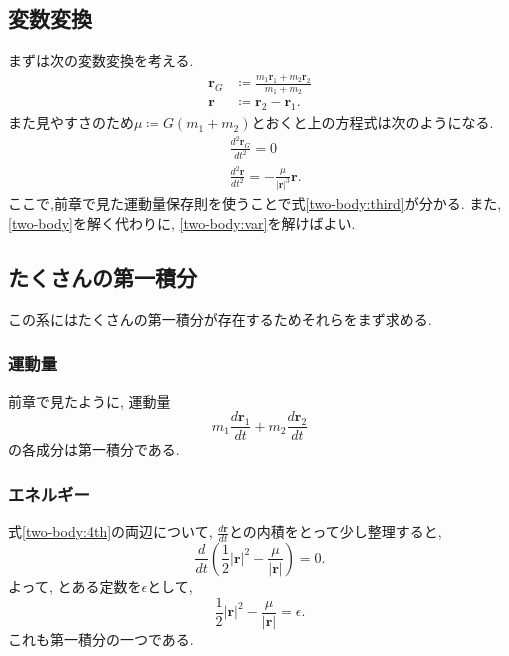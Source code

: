 \documentclass{ltjsarticle}
\theoremstyle{definition}
\numberwithin{thm}{section}
\theoremstyle{definition}
\numberwithin{prop}{section}
\theoremstyle{definition}
\numberwithin{dfn}{section}
\numberwithin{equation}{section}
\begin{document}
\subsection{変数変換}
まずは次の変数変換を考える.
\begin{subequations}
\begin{align}
    \bm{r}_G&\coloneq\frac{m_1\bm{r}_1+m_2\bm{r}_2}{m_1+m_2}\\
    \bm{r}&\coloneq\bm{r}_2-\bm{r}_1.
\end{align}
\end{subequations}
また見やすさのため$\mu\coloneq G(m_1+m_2)$とおくと上の方程式は次のようになる.
\begin{subequations} \label{two-body:var}
    \begin{align}
        &\frac{d^2\bm{r}_G}{dt^2}=0\label{two-body:third}\\
        &\frac{d^2\bm{r}}{dt^2}=-\frac{\mu}{|\bm{r}|^3}\bm{r}. \label{two-body:4th}
    \end{align}
\end{subequations}
ここで,前章で見た運動量保存則を使うことで式\cref{two-body:third}が分かる. また, \cref{two-body}を解く代わりに, \cref{two-body:var}を解けばよい.
\subsection{たくさんの第一積分}
この系にはたくさんの第一積分が存在するためそれらをまず求める.
\subsubsection{運動量}
前章で見たように, 運動量
\begin{equation} \label{two-body:momentum}
    m_1\frac{d\bm{r}_1}{dt}+m_2\frac{d\bm{r}_2}{dt}
\end{equation}
の各成分は第一積分である.
\subsubsection{エネルギー}
式\ref{two-body:4th}の両辺について, $\frac{d\bm{r}}{dt}$との内積をとって少し整理すると,
\begin{equation*}
    \frac{d}{dt}\left(\frac{1}{2}|\bm{r}|^2-\frac{\mu}{|\bm{r}|}\right)=0.
\end{equation*}
よって, とある定数を$\epsilon$として,
\begin{equation} \label{two-body:energy}
    \frac{1}{2}|\bm{r}|^2-\frac{\mu}{|\bm{r}|}=\epsilon.
\end{equation}
これも第一積分の一つである.
\end{document}
